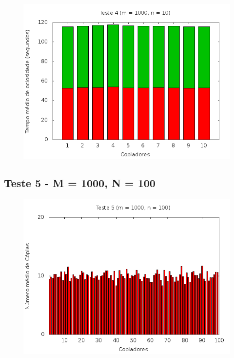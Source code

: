 \documentclass[12pt,a4paper]{article}
\begin{document}
\begin{center}
\begin{figure}[H]
    \center
    \includegraphics[scale=0.5]{imagens/grafico_ociosidade4.png}
    \label{teste4_ociosidade}
\end{figure}
\end{center}

\pagebreak
\subsection{Teste 5 - M = 1000, N = 100}
\begin{center}
\begin{figure}[H]
    \center
    \includegraphics[scale=0.5]{imagens/grafico_copias5.png}
    \label{teste5_copias}
\end{figure}
\end{center}
\end{document}
